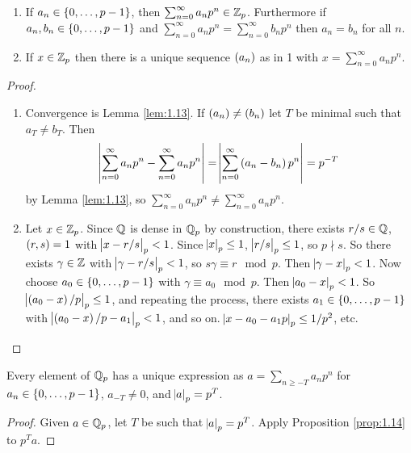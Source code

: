 \begin{proposition}
\label{prop:1.14}
\hfill
\begin{enumerate}
\item If $ a_n \in \cbr{0, \dots, p - 1} $, then $ \sum_{n = 0}^\infty a_np^n \in \mathbb{Z}_p $. Furthermore if $ a_n, b_n \in \cbr{0, \dots, p - 1} $ and $ \sum_{n = 0}^\infty a_np^n = \sum_{n = 0}^\infty b_np^n $ then $ a_n = b_n $ for all $ n $.
\item If $ x \in \mathbb{Z}_p $ then there is a unique sequence $ \br{a_n} $ as in 1 with $ x = \sum_{n = 0}^\infty a_np^n $.
\end{enumerate}
\end{proposition}

\begin{proof}
\hfill
\begin{enumerate}
\item Convergence is Lemma \ref{lem:1.13}. If $ \br{a_n} \ne \br{b_n} $ let $ T $ be minimal such that $ a_T \ne b_T $. Then
$$ \abs{\sum_{n = 0}^\infty a_np^n - \sum_{n = 0}^\infty a_np^n} = \abs{\sum_{n = 0}^\infty \br{a_n - b_n}p^n} = p^{-T} $$
by Lemma \ref{lem:1.13}, so $ \sum_{n = 0}^\infty a_np^n \ne \sum_{n = 0}^\infty a_np^n $.
\item Let $ x \in \mathbb{Z}_p $. Since $ \mathbb{Q} $ is dense in $ \mathbb{Q}_p $ by construction, there exists $ r / s \in \mathbb{Q} $, $ \br{r, s} = 1 $ with $ \abs{x - r / s}_p < 1 $. Since $ \abs{x}_p \le 1 $, $ \abs{r / s}_p \le 1 $, so $ p \nmid s $. So there exists $ \gamma \in \mathbb{Z} $ with $ \abs{\gamma - r / s}_p < 1 $, so $ s\gamma \equiv r \mod p $. Then $ \abs{\gamma - x}_p < 1 $. Now choose $ a_0 \in \cbr{0, \dots, p - 1} $ with $ \gamma \equiv a_0 \mod p $. Then $ \abs{a_0 - x}_p < 1 $. So $ \abs{\br{a_0 - x} / p}_p \le 1 $, and repeating the process, there exists $ a_1 \in \cbr{0, \dots, p - 1} $ with $ \abs{\br{a_0 - x} / p - a_1}_p < 1 $, and so on. $ \abs{x - a_0 - a_1p}_p \le 1 / p^2 $, etc.
\end{enumerate}
\end{proof}


\begin{corollary}
Every element of $ \mathbb{Q}_p $ has a unique expression as $ a = \sum_{n \ge -T} a_np^n $ for $ a_n \in \cbr{0, \dots, p - 1} $, $ a_{-T} \ne 0 $, and $ \abs{a}_p = p^T $.
\end{corollary}

\begin{proof}
Given $ a \in \mathbb{Q}_p $, let $ T $ be such that $ \abs{a}_p = p^T $. Apply Proposition \ref{prop:1.14} to $ p^Ta $.
\end{proof}

